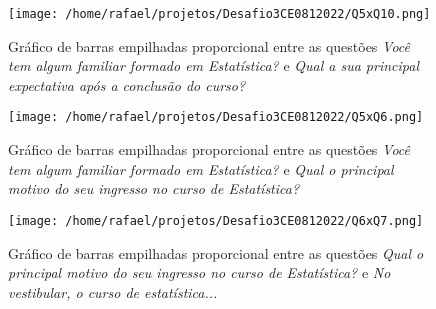 \documentclass[
        a4paper,
        11pt,
        extrafontsizes,
        oneside,
        onecolumn,
        openright,
        final,
        article,
        brazil,
        sumario=tradicional
]{abntex2}
\begin{document}
\begin{figure}[htp]
\centering
\texttt{[image: /home/rafael/projetos/Desafio3CE0812022/Q5xQ10.png]}
\caption{Gráfico de barras empilhadas proporcional entre as questões \emph{Você tem algum familiar formado em Estatística?} e \emph{Qual a sua principal expectativa após a conclusão do curso?}}
\label{Q1xQ7}
\end{figure}

\begin{figure}[htp]
\centering
\texttt{[image: /home/rafael/projetos/Desafio3CE0812022/Q5xQ6.png]}
\caption{Gráfico de barras empilhadas proporcional entre as questões \emph{Você tem algum familiar formado em Estatística?} e \emph{Qual o principal motivo do seu ingresso no curso de Estatística?}}
\label{Q2xQ6}
\end{figure}

\begin{figure}[htp]
\centering
\texttt{[image: /home/rafael/projetos/Desafio3CE0812022/Q6xQ7.png]}
\caption{Gráfico de barras empilhadas proporcional entre as questões \emph{Qual o principal motivo do seu ingresso no curso de Estatística?} e \emph{No vestibular, o curso de estatística...}}
\label{Q6xQ7}
\end{figure}

\postextual
\end{document}
